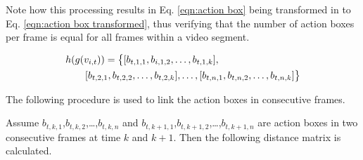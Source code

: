 
Note how this processing results in Eq. \ref{eqn:action box}
being transformed in to Eq. \ref{eqn:action box transformed},
thus verifying that the number of action boxes per frame is equal for all frames within a video segment.

\begin{equation}
\label{eqn:action box transformed}
\begin{split}
\MoveEqLeft
 h(g(v_{i,t})) = \big\{[b_{t,1,1},b_{i,1,2},\dots,b_{t,1,k}],\\
 & [b_{t,2,1},b_{t,2,2},\dots,b_{t,2,k}],\dots,[b_{t,n,1},b_{t,n,2},\dots,b_{t,n,k}]\big\}
\end{split}
\end{equation}


The following procedure is used to link the action boxes in consecutive frames.

Assume $b_{t,k,1}$,$b_{t,k,2}$,\dots,$b_{t,k,n}$ and $b_{t,k+1,1}$,$b_{t,k+1,2}$,\dots,$b_{t,k+1,n}$  are action boxes in two
consecutive frames at time $k$ and $k+1$. Then the following distance matrix is calculated.




